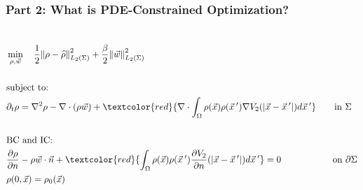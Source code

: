 \documentclass[aspectratio=169,xcolor=dvipsnames]{beamer}
\begin{document}
\begin{frame}
	\frametitle{Part 2: What is PDE-Constrained Optimization? }
	\begin{columns}


		\begin{align*}
		&\min_{\rho,\vec{w}} \quad \frac{1}{2}\norm{\rho- \widehat{\rho}}_{L_2(\Sigma)}^2 + \frac{\beta}{2} \norm{\vec{w}}_{L_2(\Sigma)}^2\\
		\\
		&\text{subject to:}
		\\
		& \partial_t \rho = \nabla^2 \rho - \nabla \cdot (\rho \vec{w})+\textcolor{red}{\nabla \cdot \int_\Omega \rho(\vec{x}) \rho(\vec{x}\hspace{0.2em}') \nabla V_2(|\vec{x}-\vec{x}\hspace{0.2em}'|)d\vec{x}\hspace{0.2em}'} \qquad \text{in    } \Sigma\\
		\\
		&\text{BC } \text{and IC:}\\
		&\frac{\partial \rho}{\partial n} - \rho \vec{w} \cdot \vec{n} +\textcolor{red}{ \int_\Omega \rho(\vec{x}) \rho(\vec{x}\hspace{0.2em}')  \frac{ \partial  V_2}{\partial n}(|\vec{x}-\vec{x}\hspace{0.2em}'|)d\vec{x}\hspace{0.2em}'} = 0 \quad \ \ \qquad \qquad\text{on   } \partial \Sigma   \\
		&\rho(0,\vec{x}) = \rho_0(\vec{x}) 
		\end{align*}
		\vspace{-1cm}
		\begin{figure}	
			\includegraphics[width=3cm]{bloodcells.jpg}\\
			\includegraphics[width=3cm]{bacteria.png}\\			
			\includegraphics[width=3cm]{Microfilter.png}\\
			\includegraphics[width=3cm]{beer.png}
		\end{figure}
	\end{columns}
\end{frame}
\end{document}
